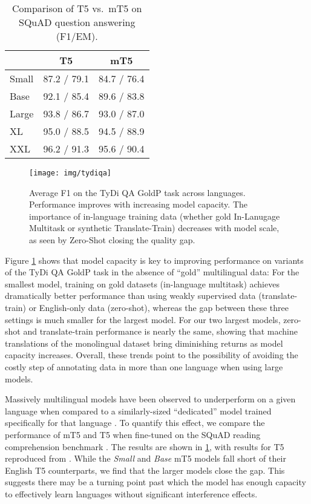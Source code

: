 \documentclass[11pt]{article}
\begin{document}
\begin{table}[t]
\centering
\footnotesize
\begin{tabular}{lcc}
\toprule
      & T5 & mT5 \\\midrule
Small & 87.2 / 79.1 & 84.7 / 76.4 \\
Base  & 92.1 / 85.4 & 89.6 / 83.8 \\
Large & 93.8 / 86.7 & 93.0 / 87.0 \\
XL    & 95.0 / 88.5 & 94.5 / 88.9 \\
XXL   & 96.2 / 91.3 & 95.6 / 90.4 \\ \bottomrule
\end{tabular}
\caption{Comparison of T5 vs.\ mT5 on SQuAD question answering (F1/EM).}
\label{tbl:squad}
\end{table}

\begin{figure}
    \centering
    \texttt{[image: img/tydiqa]}
    \caption{Average F1 on the TyDi QA GoldP task across languages. Performance improves with increasing model capacity. The importance of in-language training data (whether gold In-Lanugage Multitask or synthetic Translate-Train) decreases with model scale, as seen by Zero-Shot closing the quality gap.}
    \label{fig:tydiqa}
\end{figure}

Figure \ref{fig:tydiqa} shows that model capacity is key to improving performance on variants of the TyDi QA GoldP task in the absence of ``gold'' multilingual data:
For the smallest model, training on gold datasets (in-language multitask) achieves dramatically better performance than using weakly supervised data (translate-train) or English-only data (zero-shot), whereas the gap between these three settings is much smaller for the largest model.
For our two largest models, zero-shot and translate-train performance is nearly the same, showing that machine translations of the monolingual dataset bring diminishing returns as model capacity increases.
Overall, these trends point to the possibility of avoiding the costly step of annotating data in more than one language when using large models.

Massively multilingual models have been observed to underperform on a given language when compared to a similarly-sized ``dedicated'' model trained specifically for that language \citep{arivazhagan2019massively}.
To quantify this effect, we compare the performance of mT5 and T5 when fine-tuned on the SQuAD reading comprehension benchmark \citep{rajpurkar2016squad}.
The results are shown in \cref{tbl:squad}, with results for T5 reproduced from \citet{2020t5}.
While the \textit{Small} and \textit{Base} mT5 models fall short of their English T5 counterparts, we find that the larger models close the gap.
This suggests there may be a turning point past which the model has enough capacity to effectively learn  languages without significant interference effects.
\end{document}

